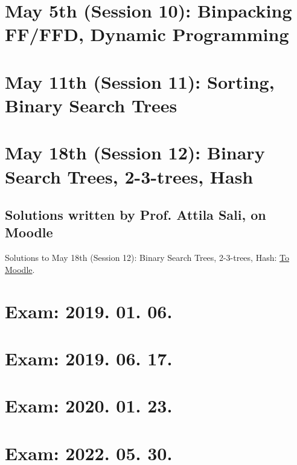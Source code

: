 \documentclass[a4paper]{article}
\begin{document}
\section{May 5th (Session 10): Binpacking FF/FFD, Dynamic Programming}
\pagebreak

\section{May 11th (Session 11): Sorting, Binary Search Trees}
\pagebreak

\section{May 18th (Session 12): Binary Search Trees, 2-3-trees, Hash}
\subsection{Solutions written by Prof. Attila Sali, on Moodle}
Solutions to May 18th (Session 12): Binary Search Trees, 2-3-trees, Hash: \href{https://edu.vik.bme.hu/pluginfile.php/325461/mod\_resource/content/1/main.pdf}{To Moodle}.
\pagebreak
\pagebreak

\section{Exam: 2019. 01. 06.}
\pagebreak

\section{Exam: 2019. 06. 17.}
\setcounter{subsection}{3}
\pagebreak

\section{Exam: 2020. 01. 23.}
\setcounter{subsection}{2}
\pagebreak

\section{Exam: 2022. 05. 30.}
\pagebreak
\pagebreak
\pagebreak
\pagebreak
\pagebreak
\pagebreak
\pagebreak
\end{document}

